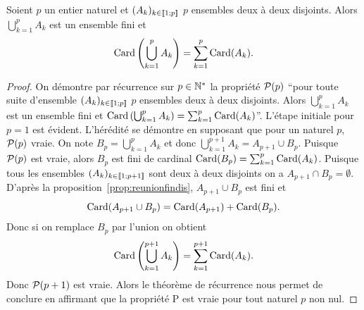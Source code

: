 \begin{prop}
  Soient \(p\) un entier naturel et \((A_k)_{k\in\intervalleentier{1}{p}}\) \(p\) ensembles deux à deux disjoints. Alors \(\bigcup_{k=1}^{p}A_k\) est un ensemble fini et
  \begin{equation}
    \Card\left(\bigcup_{k=1}^{p}A_k\right)=\sum_{k=1}^{p}\Card(A_k).
  \end{equation}
\end{prop}
\begin{proof}
  On démontre par récurrence sur \(p\in \N^*\) la propriété \(\P(p)\) ``pour toute suite d'ensemble \((A_k)_{k\in\intervalleentier{1}{p}}\) \(p\) ensembles deux à deux disjoints. Alors \(\bigcup_{k=1}^{p}A_k\) est un ensemble fini et \(\Card\left(\bigcup_{k=1}^{p}A_k\right)=\sum_{k=1}^{p}\Card(A_k)\)''. L'étape initiale pour \(p=1\) est évident. L'hérédité se démontre en supposant que pour un naturel \(p\), \(\P(p)\) vraie. On note \(B_p=\bigcup_{k=1}^{p}A_k\) et donc \(\bigcup_{k=1}^{p+1}A_k=A_{p+1}\cup B_p\). Puisque \(\P(p)\) est vraie, alors \(B_p\) est fini de cardinal \(\Card(B_p)=\sum_{k=1}^{p}\Card(A_k)\). Puisque tous les ensembles \((A_k)_{k\in\intervalleentier{1}{p+1}}\) sont deux à deux disjoints on a \(A_{p+1}\cap B_p=\emptyset\). D'après la proposition~\ref{prop:reunionfindis}, \(A_{p+1}\cup B_p\) est fini et
\begin{equation}
  \Card(A_{p+1}\cup B_p) = \Card(A_{p+1})+\Card(B_p).
\end{equation}
Donc si on remplace \(B_p\) par l'union on obtient
\begin{equation}
  \Card\left(\bigcup_{k=1}^{p+1}A_k\right) = \sum_{k=1}^{p+1}\Card(A_k).
\end{equation}
Donc \(\P(p+1)\) est vraie. Alors le théorème de récurrence nous permet de conclure en affirmant que la propriété P est vraie pour tout naturel \(p\) non nul.
\end{proof}

